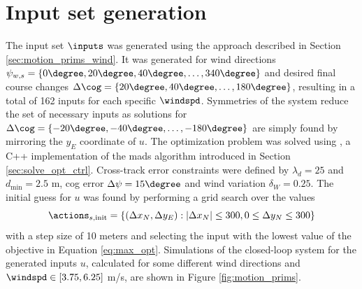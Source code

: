 \section{Input set generation}
The input set $\inputs$ was generated using the approach described in Section \ref{sec:motion_prims_wind}. 
It was generated for wind directions $\psi_{w,s}=\{0\degree,20\degree,40\degree,\hdots,340\degree\}$ and desired final course changes
$\Delta\cog=\{20\degree,40\degree,\hdots,180\degree\}$, resulting in a total of 162 inputs for each specific $\windspd$. Symmetries of the system reduce the set of necessary inputs
as solutions for $\Delta\cog=\{-20\degree,-40\degree,\hdots,-180\degree\}$ are simply found by mirroring the $y_E$ coordinate of $u$.
The optimization problem was solved using  \cite{nomad}, a C++ implementation of the \ac{mads} algorithm introduced in Section \ref{sec:solve_opt_ctrl}.
Cross-track error constraints were defined by $\lambda_d=25$ and $d_{\text{min}}=2.5$ m, \ac{cog} error $\Delta\psi=15\degree$ and wind variation $\delta_W=0.25$. The initial guess for $u$ 
was found by performing a grid search over the values
\begin{equation}
    \actions_{s,\text{init}}=\{(\Delta x_N,\Delta y_E): |\Delta x_N| \leq 300, 0\leq \Delta y_N \leq 300\}
\end{equation}
with a step size of 10 meters and selecting the input with the lowest value of the objective in Equation \eqref{eq:max_opt}.
Simulations of the closed-loop system for the generated inputs $u$, calculated for some different wind directions and $\windspd\in[3.75, 6.25]$ m/s, are shown in Figure \ref{fig:motion_prims}.
